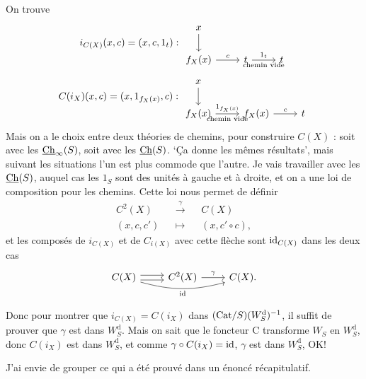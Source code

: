 On trouve
\[
i_{C(X)}(x,c)=(x,c,1_t):
\begin{tikzcd}
x \arrow[d] & & \\
f_X(x) \arrow[r, "c"] & t \arrow[r, "1_t", "\text{chemin vide}"'] & t
\end{tikzcd}
\]
\[
C(i_X)(x,c)=(x,1_{f_X(x)},c):
\begin{tikzcd}
x \arrow[d] & & \\
f_X(x) \arrow[r, "1_{f_X(x)}", "\text{chemin vide}"'] & f_X(x) \arrow[r, "c"] & t
\end{tikzcd}
\]
Mais on a le choix entre deux théories de chemins, pour construire $C(X)$ : soit avec les $\underline{\mathrm{Ch}}_\infty(S)$, soit avec les $\underline{\mathrm{Ch}}(S)$. ‘Ça donne les mêmes résultats’, mais suivant les situations l'un est plus commode que l'autre. Je vais travailler avec les $\underline{\mathrm{Ch}}(S)$, auquel cas les $1_S$ sont des unités à gauche et à droite, et on a une loi de composition pour les chemins. Cette loi nous permet de définir
\[
\begin{aligned}
C^2(X)&&\xrightarrow{\ \gamma\ }&&C(X)\\
(x,c,c')&&\longmapsto&&(x,c'\circ c),
\end{aligned}
\]
et les composés de $i_{C(X)}$ et de $C_{i(X)}$ avec cette flèche sont $\mathrm{id}_{C(X)}$ dans les deux cas %
\[
\begin{tikzcd}
C(X) \arrow[r, shift left] \arrow[r, shift right] \arrow[rr, bend right=15, "\id"'] & C^2(X) \arrow[r, "\gamma"] & C(X).
\end{tikzcd}
\]

Donc pour montrer que $i_{C(X)}=C(i_X)$ dans $(\mathrm{Cat}/S)(W_S^{\mathrm{d}})^{-1}$, il suffit de prouver que $\gamma$ est dans $W_S^{\mathrm{d}}$. Mais on sait que le foncteur C transforme $W_S$ en $W_S^{\mathrm{d}}$, donc $C(i_X)$ est dans $W_S^{\mathrm{d}}$, et comme $\gamma\circ C(i_X)=\mathrm{id}$, $\gamma$ est dans $W_S^{\mathrm{d}}$, OK! %

J'ai envie de grouper ce qui a été prouvé dans un énoncé récapitulatif.

